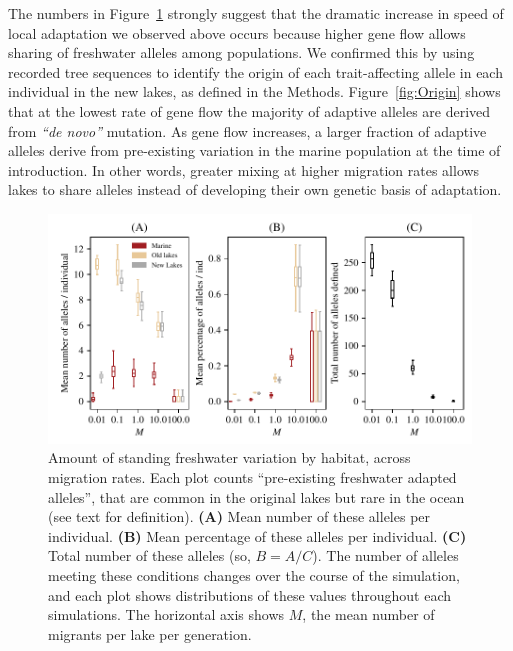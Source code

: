 \documentclass{article}
\begin{document}
The numbers in Figure~\ref{fig:MPFAI} strongly suggest that the dramatic increase in speed of local adaptation we observed above occurs because higher gene flow allows sharing of freshwater alleles among populations.
We confirmed this by using recorded tree sequences to identify the origin of each trait-affecting allele in each individual in the new lakes, as defined in the Methods. 
Figure~\ref{fig:Origin} shows that at the lowest rate of gene flow the majority of adaptive alleles are derived from \emph{``de novo''} mutation. 
As gene flow increases, a larger fraction of adaptive alleles derive from pre-existing variation in the marine population at the time of introduction. 
In other words, greater mixing at higher migration rates allows lakes to share alleles instead of developing their own genetic basis of adaptation.

\begin{figure}
    \begin{center}
          \includegraphics{Final_Plots/Freshwater_Alleles.pdf}
          \caption{
            Amount of standing freshwater variation by habitat, across migration rates.
            Each plot counts ``pre-existing freshwater adapted alleles'',
            that are common in the original lakes but rare in the ocean
            (see text for definition).
            \textbf{(A)} Mean number of these alleles per individual.
            \textbf{(B)} Mean percentage of these alleles per individual.
            \textbf{(C)} Total number of these alleles (so, $B = A/C$).
            The number of alleles meeting these conditions changes over the course of the simulation,
            and each plot shows distributions of these values throughout each simulations.
            The horizontal axis shows $M$, the mean number of migrants per lake per generation.}
        \label{fig:MPFAI}
    \end{center}
\end{figure}
\end{document}
